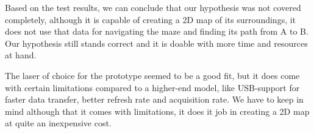 Based on the test results, we can conclude that our hypothesis was not covered completely, although it is capable of creating a 2D map of its surroundings, it does not use that data for navigating the maze and finding its path from A to B. Our hypothesis still stands correct and it is doable with more time and resources at hand.

The laser of choice for the prototype seemed to be a good fit, but it does come with certain limitations compared to a higher-end model, like USB-support for faster data transfer, better refresh rate and acquisition rate. We have to keep in mind although that it comes with limitations, it does it job in creating a 2D map at quite an inexpensive cost.



